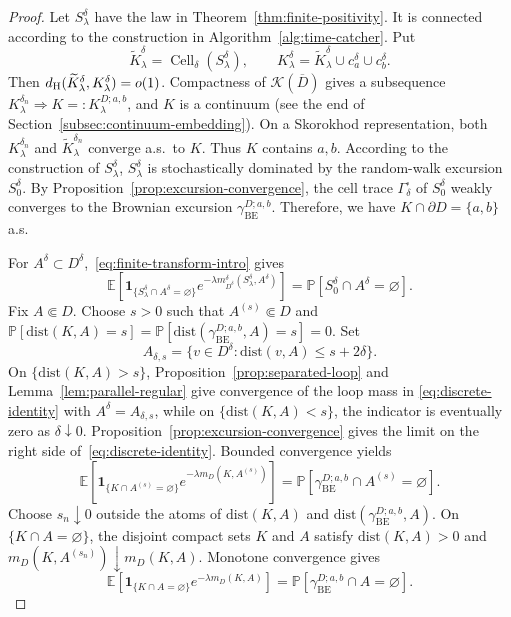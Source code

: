 \documentclass[11pt]{article}
\numberwithin{equation}{section}
\newcommand{\E}{\mathbb{E}}
\newcommand{\1}{\mathbf{1}}
\newcommand{\BE}{\mathrm{BE}}
\newcommand{\dist}{\mathrm{dist}}
\newcommand\ol[1]{\overline{#1}}
\newcommand{\one}{\mathbf 1}
\newcommand{\Prob}{\mathbb P}
\newcommand{\Cell}{\operatorname{Cell}}
\begin{document}
\begin{proof}
Let \(S_\lambda^\delta\) have the law in
Theorem~\ref{thm:finite-positivity}.  It is connected according to the construction in Algorithm~\ref{alg:time-catcher}. Put
\[
 \widetilde K_\lambda^\delta=\Cell_\delta(S_\lambda^\delta),\qquad
 K_\lambda^\delta=\widetilde K_\lambda^\delta
                    \cup c_a^\delta\cup c_b^\delta .
\]
Then $d_{\rm H}(\widetilde K_\lambda^\delta,K_\lambda^\delta)=o(1)$.
Compactness of \(\mathcal K(\ol D)\) gives a subsequence
\(K_\lambda^{\delta_n}\Longrightarrow K=:K_\lambda^{D;a,b}\), and $K$ is a continuum (see the end of Section~\ref{subsec:continuum-embedding}).
On a Skorokhod representation, both \(K_\lambda^{\delta_n}\) and
\(\widetilde K_\lambda^{\delta_n}\) converge a.s.~to \(K\).
Thus \(K\) contains \(a,b\). According to the construction of $S_\lambda^\delta$, $S_\lambda^\delta$ is stochastically dominated by the random-walk excursion $S_0^\delta$. By Proposition~\ref{prop:excursion-convergence}, the cell trace $\Gamma_\delta^\square$ of $S_0^\delta$ weakly converges to the Brownian excursion $\gamma_{\BE}^{D;a,b}$. Therefore, we have
\(K\cap\partial D=\{a,b\}\) a.s.


For \(A^\delta\subset D^\delta\),~\eqref{eq:finite-transform-intro} gives
\begin{equation}\label{eq:discrete-identity}
 \E\left[
 \one_{\{S_\lambda^\delta\cap A^\delta=\varnothing\}}
 e^{-\lambda m_{D^\delta}^\delta(S_\lambda^\delta,A^\delta)}
 \right]
 =\Prob[S_0^\delta\cap A^\delta=\varnothing].
\end{equation}
Fix \(A\Subset D\).  Choose \(s>0\) such that \(A^{(s)}\Subset D\) and $\Prob[\dist(K,A)=s]=\Prob[\dist(\gamma_{\BE}^{D;a,b},A)=s]=0$. Set
\[
 A_{\delta,s}=\{v\in D^\delta:\dist(v,A)\leq s+2\delta\}.
\]
On \(\{\dist(K,A)>s\}\), Proposition~\ref{prop:separated-loop} and
Lemma~\ref{lem:parallel-regular} give convergence of the loop mass in
\eqref{eq:discrete-identity} with \(A^\delta=A_{\delta,s}\), while on \(\{\dist(K,A)<s\}\), the indicator is eventually zero as $\delta\downarrow0$.
Proposition~\ref{prop:excursion-convergence} gives the limit on the right side of~\eqref{eq:discrete-identity}.
Bounded convergence yields
\begin{equation}
 \E\!\left[
 \one_{\{K\cap A^{(s)}=\varnothing\}}
 e^{-\lambda m_D(K,A^{(s)})}\right]
 =\Prob[\gamma_{\BE}^{D;a,b}\cap A^{(s)}=\varnothing].
\end{equation}
Choose \(s_n\downarrow0\) outside the atoms of
\(\dist(K,A)\) and \(\dist(\gamma_{\BE}^{D;a,b},A)\).  On
\(\{K\cap A=\varnothing\}\), the disjoint compact sets \(K\) and
\(A\) satisfy \(\dist(K,A)>0\) and
\(m_D(K,A^{(s_n)})\downarrow m_D(K,A)\).  Monotone convergence gives
\begin{equation}\label{eq:identity-interior}
 \E\!\left[
 \one_{\{K\cap A=\varnothing\}}e^{-\lambda m_D(K,A)}\right]
 =\Prob\left[\gamma_{\BE}^{D;a,b}\cap A=\varnothing\right].
\end{equation}


\end{proof}
\end{document}
